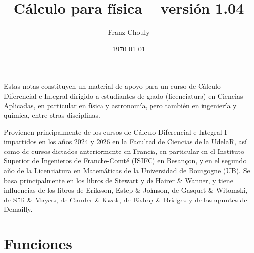 \documentclass[12pt, a4paper]{article}
\title{Cálculo para física -- versión 1.04}
\author{Franz Chouly}
\date{\today}
\theoremstyle{rioplatense}
\begin{document}
\maketitle

\tableofcontents

\newpage


Estas notas constituyen un material de apoyo para un curso de Cálculo Diferencial e Integral dirigido a estudiantes de grado (licenciatura) en Ciencias Aplicadas, en particular en física y astronomía, pero también en ingeniería y química, entre otras disciplinas.

Provienen principalmente de los cursos de Cálculo Diferencial e Integral I impartidos en los años 2024 y 2026 en la Facultad de Ciencias de la UdelaR, así como de cursos dictados anteriormente en Francia, en particular en el Instituto Superior de Ingenieros de Franche-Comté (ISIFC) en Besançon, y en el segundo año de la Licenciatura en Matemáticas de la Universidad de Bourgogne (UB). 
Se basa principalmente en los libros de Stewart y de Hairer \& Wanner, y tiene influencias de los libros de Eriksson, Estep \& Johnson, de Gasquet \& Witomski, de S\"uli \& Mayers, de Gander \& Kwok, de Bishop \& Bridges y de los apuntes de Demailly.





\newpage

\section{Funciones}
\end{document}
